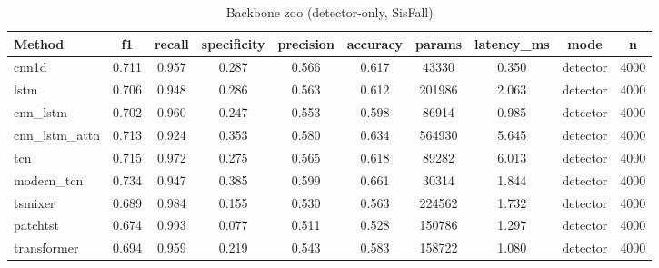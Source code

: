 \begin{table}[t]
\centering
\caption{Backbone zoo (detector-only, SisFall)}
\begin{tabular}{lccccccccc}
\toprule
Method & f1 & recall & specificity & precision & accuracy & params & latency_ms & mode & n \\
\midrule
cnn1d & 0.711 & 0.957 & 0.287 & 0.566 & 0.617 & 43330 & 0.350 & detector & 4000 \\
lstm & 0.706 & 0.948 & 0.286 & 0.563 & 0.612 & 201986 & 2.063 & detector & 4000 \\
cnn_lstm & 0.702 & 0.960 & 0.247 & 0.553 & 0.598 & 86914 & 0.985 & detector & 4000 \\
cnn_lstm_attn & 0.713 & 0.924 & 0.353 & 0.580 & 0.634 & 564930 & 5.645 & detector & 4000 \\
tcn & 0.715 & 0.972 & 0.275 & 0.565 & 0.618 & 89282 & 6.013 & detector & 4000 \\
modern_tcn & 0.734 & 0.947 & 0.385 & 0.599 & 0.661 & 30314 & 1.844 & detector & 4000 \\
tsmixer & 0.689 & 0.984 & 0.155 & 0.530 & 0.563 & 224562 & 1.732 & detector & 4000 \\
patchtst & 0.674 & 0.993 & 0.077 & 0.511 & 0.528 & 150786 & 1.297 & detector & 4000 \\
transformer & 0.694 & 0.959 & 0.219 & 0.543 & 0.583 & 158722 & 1.080 & detector & 4000 \\
\bottomrule
\end{tabular}
\end{table}